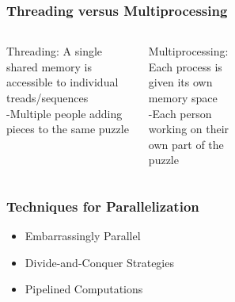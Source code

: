 \documentclass{beamer}
\begin{document}
\begin{frame}
 \frametitle{Threading versus Multiprocessing}
 
\begin{columns}[c] %


 
\begin{block}{Threading:}
A single shared memory is accessible to individual treads/sequences\\
{\color{blue} -Multiple people adding pieces to the same puzzle}
\end{block}

\begin{block}{Multiprocessing:}
Each process is given its own memory space\\
{\color{blue}-Each person working on their own part of the puzzle}
\end{block}
 

\begin{figure}
\end{figure}

\begin{figure}
\end{figure}

 

\end{columns}
 

\end{frame}


\begin{frame}
 \frametitle{Techniques for Parallelization}
 
 \begin{itemize}
 \item Embarrassingly Parallel
 \item Divide-and-Conquer Strategies
 \item Pipelined Computations
 \end{itemize}
\end{frame}
\end{document}
